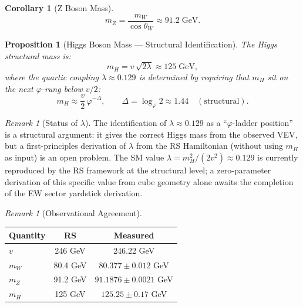 \documentclass[12pt,a4paper]{article}
\newtheorem{corollary}[theorem]{Corollary}
\newtheorem{proposition}[theorem]{Proposition}
\theoremstyle{definition}
\theoremstyle{remark}
\newtheorem{remark}[theorem]{Remark}
\begin{document}
\begin{corollary}[Z Boson Mass]
\begin{equation}
  m_Z = \frac{m_W}{\cos\theta_W} \approx 91.2\;\mathrm{GeV}.
\end{equation}
\end{corollary}

\begin{proposition}[Higgs Boson Mass --- Structural Identification]
The Higgs structural mass is:
\begin{equation}
  m_H = v\,\sqrt{2\lambda} \approx 125\;\mathrm{GeV},
  \label{eq:mH}
\end{equation}
where the quartic coupling $\lambda \approx 0.129$ is determined by
requiring that $m_H$ sit on the next $\varphi$-rung below $v/2$:
\begin{equation}
  m_H \approx \frac{v}{2}\,\varphi^{-\Delta},\qquad
  \Delta = \log_\varphi 2 \approx 1.44
  \quad(\text{structural}).\label{eq:mH_rung}
\end{equation}
\end{proposition}

\begin{remark}[Status of $\lambda$]
The identification of $\lambda \approx 0.129$ as a ``$\varphi$-ladder
position'' is a structural argument: it gives the correct Higgs mass
from the observed VEV, but a first-principles derivation of $\lambda$
from the RS Hamiltonian (without using $m_H$ as input) is an open
problem.  The SM value $\lambda = m_H^2/(2v^2) \approx 0.129$ is
currently reproduced by the RS framework at the structural level;
a zero-parameter derivation of this specific value from cube geometry
alone awaits the completion of the EW sector yardstick derivation.
\end{remark}

\begin{remark}[Observational Agreement]
\begin{center}
\renewcommand{\arraystretch}{1.3}
\begin{tabular}{lcc}
\hline
\textbf{Quantity} & \textbf{RS} & \textbf{Measured} \\
\hline
$v$ & 246 GeV & 246.22 GeV \\
$m_W$ & 80.4 GeV & $80.377 \pm 0.012$ GeV \\
$m_Z$ & 91.2 GeV & $91.1876 \pm 0.0021$ GeV \\
$m_H$ & 125 GeV & $125.25 \pm 0.17$ GeV \\
\hline
\end{tabular}
\end{center}
\end{remark}
\end{document}
